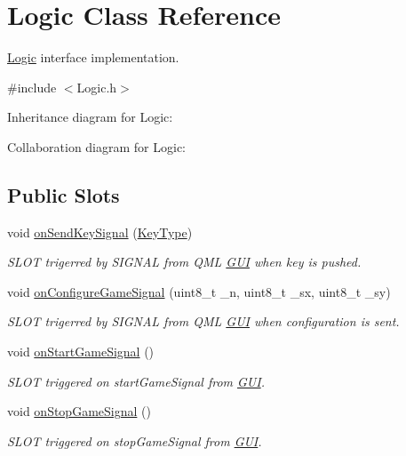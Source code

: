 \hypertarget{class_logic}{\section{Logic Class Reference}
\label{class_logic}
}


\hyperlink{class_logic}{Logic} interface implementation.  




{\ttfamily \#include $<$Logic.\+h$>$}



Inheritance diagram for Logic\+:


Collaboration diagram for Logic\+:
\subsection*{Public Slots}
\begin{DoxyCompactItemize}
\item 
void \hyperlink{class_logic_a9c692b3dd5ac6e55bbe7b0aa824b8d2b}{on\+Send\+Key\+Signal} (\hyperlink{_i_key_type_8h_aab0feaba617470cb4aa830dc5935238c}{Key\+Type})
\begin{DoxyCompactList}\small\item\em S\+L\+O\+T trigerred by S\+I\+G\+N\+A\+L from Q\+M\+L \hyperlink{class_g_u_i}{G\+U\+I} when key is pushed. \end{DoxyCompactList}\item 
void \hyperlink{class_logic_a5fe01497c7c6fb9df98fda43fcb2d9f4}{on\+Configure\+Game\+Signal} (uint8\+\_\+t \+\_\+n, uint8\+\_\+t \+\_\+sx, uint8\+\_\+t \+\_\+sy)
\begin{DoxyCompactList}\small\item\em S\+L\+O\+T trigerred by S\+I\+G\+N\+A\+L from Q\+M\+L \hyperlink{class_g_u_i}{G\+U\+I} when configuration is sent. \end{DoxyCompactList}\item 
void \hyperlink{class_logic_a650bd99eef59a4ed2b4f4e1b5f0d00e1}{on\+Start\+Game\+Signal} ()
\begin{DoxyCompactList}\small\item\em S\+L\+O\+T triggered on start\+Game\+Signal from \hyperlink{class_g_u_i}{G\+U\+I}. \end{DoxyCompactList}\item 
void \hyperlink{class_logic_a4b486bf7ee95ec3e8f8ed8a84ed99748}{on\+Stop\+Game\+Signal} ()
\begin{DoxyCompactList}\small\item\em S\+L\+O\+T triggered on stop\+Game\+Signal from \hyperlink{class_g_u_i}{G\+U\+I}. \end{DoxyCompactList}\end{DoxyCompactItemize}
